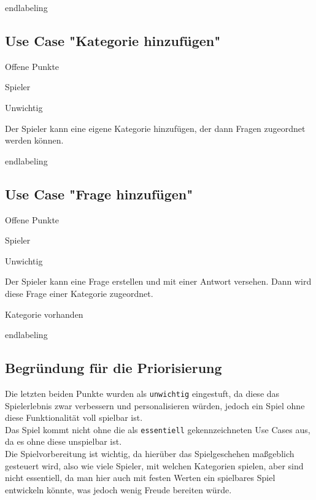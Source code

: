 end{labeling}

\subsection{Use Case "Kategorie hinzufügen"}
\begin{labeling}[:]{Offene Punkte}
\item [Akteure] Spieler
\item [Priorität] Unwichtig
\item [Beschreibung] Der Spieler kann eine eigene Kategorie hinzufügen, der dann Fragen zugeordnet werden können.
\item [Vorbedigungen]
\item [Offene Punkte]
\end{labeling}end{labeling}

\subsection{Use Case "Frage hinzufügen"}
\begin{labeling}[:]{Offene Punkte}
\item [Akteure] Spieler
\item [Priorität] Unwichtig
\item [Beschreibung] Der Spieler kann eine Frage erstellen und mit einer Antwort versehen. Dann wird diese Frage einer Kategorie zugeordnet.
\item [Vorbedigungen] Kategorie vorhanden
\item [Offene Punkte]
\end{labeling}end{labeling}

\subsection{Begründung für die Priorisierung}

Die letzten beiden Punkte wurden als \texttt{unwichtig} eingestuft, da diese das Spielerlebnis zwar verbessern und personalisieren würden, jedoch ein Spiel ohne diese Funktionalität voll spielbar ist.\\
Das Spiel kommt nicht ohne die als \texttt{essentiell} gekennzeichneten Use Cases aus, da es ohne diese unspielbar ist.\\
Die Spielvorbereitung ist wichtig, da hierüber das Spielgeschehen maßgeblich gesteuert wird, also wie viele Spieler, mit welchen Kategorien spielen, aber sind nicht essentiell, da man hier auch mit festen Werten ein spielbares Spiel entwickeln könnte, was jedoch wenig Freude bereiten würde.

